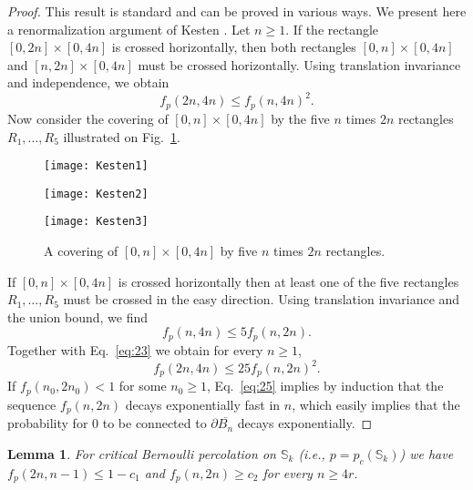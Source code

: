 \documentclass[12pt, twoside,a4paper,reqno]{amsart}
\theoremstyle{plain}
\newtheorem{lemma}[theorem]{Lemma}
\theoremstyle{remark}
\theoremstyle{definition}
\newcommand{\ol}{\overline}
\begin{document}
\begin{proof}
  This result is standard and can be proved in various ways. We present here a
  renormalization argument of Kesten \cite{kesten1982percolation}. Let $n\ge1$.
  If the rectangle $[0,2n]\times[0,4n]$ is crossed horizontally, then both
  rectangles $[0,n]\times[0,4n]$ and $[n,2n]\times[0,4n]$ must be crossed
  horizontally. Using translation invariance and independence, we obtain
  \begin{equation}
    \label{eq:23}
    f_p(2n,4n)\le f_p(n,4n)^2.
  \end{equation}
  Now consider the covering of $[0,n]\times[0,4n]$ by the five $n$ times $2n$
  rectangles $R_1,\ldots,R_5$ illustrated on Fig.~\ref{fig:covering}.
  \begin{figure}
    \centering
    \hfill
    \begin{minipage}[t]{.2\linewidth}
      \texttt{[image: Kesten1]}
    \end{minipage}
    \hfill
    \begin{minipage}[t]{.2\linewidth}
      \texttt{[image: Kesten2]}
    \end{minipage}
    \hfill
    \begin{minipage}[t]{.2\linewidth}
      \texttt{[image: Kesten3]}
    \end{minipage}
    \hfill
    \caption{A covering of $[0,n]\times[0,4n]$ by five $n$ times $2n$ rectangles.}\label{fig:covering}
  \end{figure}
  If $[0,n]\times[0,4n]$ is crossed horizontally then at least one of the five
  rectangles $R_1,\ldots, R_5$ must be crossed in the easy direction. Using
  translation invariance and the union bound, we find
  \begin{equation}
    \label{eq:24}
    f_p(n,4n)\le 5 f_p(n,2n).
  \end{equation}
  Together with Eq.~\eqref{eq:23} we obtain for every $n\ge1$,
  \begin{equation}
    \label{eq:25}
    f_p(2n,4n)\le 25 f_p(n,2n)^2.
  \end{equation}
  If $f_p(n_0,2n_0)<1$ for some $n_0\ge1$, Eq.~\eqref{eq:25} implies by
  induction that the sequence $f_p(n,2n)$ decays exponentially fast in $n$,
  which easily implies that the probability for $0$ to be connected to $\partial
  \ol{B _{n}}$ decays exponentially.
\end{proof}



\begin{lemma}
\label{lem:renormalization-inputs} For critical Bernoulli percolation on
$\mathbb S_{k}$ (i.e., $p=p_{c}(\mathbb S_{k})$) we have $f_p(2n,n-1)\leq 1-c_{1}$ and $%
f_p(n,2n)\geq c_{2}$ for every $n \ge 4r$.
\end{lemma}
\end{document}

